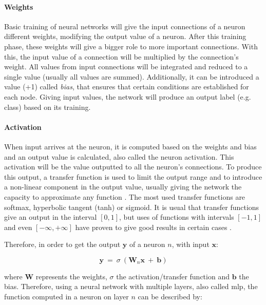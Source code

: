 \documentclass[
  twoside,
  11pt, a4paper,
  footinclude=true,
  headinclude=true,
  cleardoublepage=empty
]{scrbook}
\begin{document}
        \paragraph{Weights}
          Basic training of neural networks will give the input connections of a neuron different weights, modifying the output value of a neuron. After this training phase, these weights will give a bigger role to more important connections. With this, the input value of a connection will be multiplied by the connection's weight. All values from input connections will be integrated and reduced to a single value (usually all values are summed). Additionally, it can be introduced a value (+1) called \textit{bias}, that ensures that certain conditions are established for each node. Giving input values, the network will produce an output label (e.g. class) based on its training.

        \paragraph{Activation}
          When input arrives at the neuron, it is computed based on the weights and bias and an output value is calculated, also called the neuron activation. This activation will be the value outputted to all the neuron's connections. To produce this output, a transfer function is used to limit the output range and to introduce a non-linear component in the output value, usually giving the network the capacity to approximate any function \cite{leshno1993multilayer}. The most used transfer functions are softmax, hyperbolic tangent (tanh) or sigmoid. It is usual that transfer functions give an output in the interval $[0,1]$, but uses of functions with intervals $[-1,1]$ and even $[-\infty,+\infty]$ have proven to give good results in certain cases \cite{karlik2011performance}.

          Therefore, in order to get the output $\boldsymbol{y}$ of a neuron $n$, with input $\boldsymbol{x}$:

          \begin{equation}
            \boldsymbol{y}\ =\ \sigma\ (\boldsymbol{W}_n\boldsymbol{x}\ +\ \boldsymbol{b})
          \end{equation}

          where $\boldsymbol{W}$ represents the weights, $\sigma$ the activation/transfer function and $\boldsymbol{b}$ the bias. Therefore, using a neural network with multiple layers, also called \gls{mlp}, the function computed in a neuron on layer $n$ can be described by:
\end{document}
